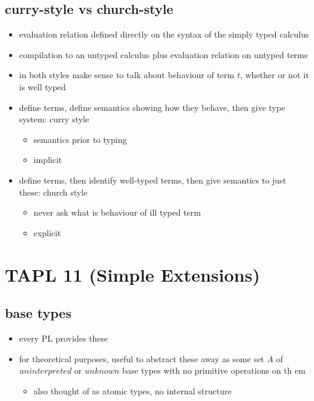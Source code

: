 \documentclass[11pt]{article}
\begin{document}
\subsection{curry-style vs church-style}
\label{sec:orgbe0c883}
\begin{itemize}
\item evaluation relation defined directly on the syntax of the simply typed calculus
\item compilation to an untyped calculus plus evaluation relation on untyped terms

\item in both styles make sense to talk about behaviour of term \(t\), whether or not it is well typed
\item define terms, define semantics showing how they behave, then give type system: curry style
\begin{itemize}
\item semantics prior to typing
\item implicit
\end{itemize}
\item define terms, then identify well-typed terms, then give semantics to just these: church style
\begin{itemize}
\item never ask what is behaviour of ill typed term
\item explicit
\end{itemize}
\end{itemize}

\section{TAPL 11 (Simple Extensions)}
\label{sec:orgb027f56}


\subsection{base types}
\label{sec:org19fd38b}
\begin{itemize}
\item every PL provides these
\item for theoretical purposes, useful to abstract these away as some set \(A\) of \(uninterpreted\) or \(unknown\) base types with no primitive operations on th em
\begin{itemize}
\item also thought of as atomic types, no internal structure
\end{itemize}
\end{itemize}
\end{document}
